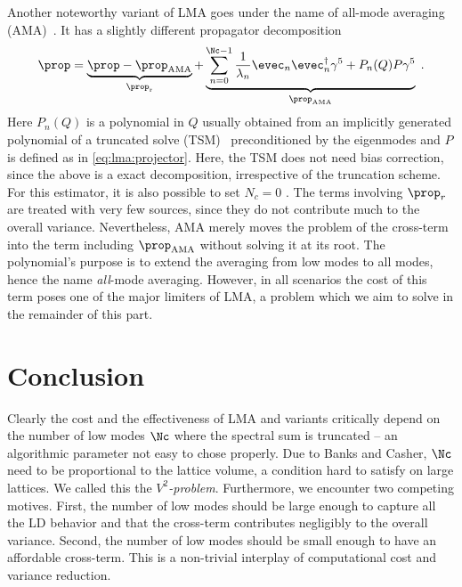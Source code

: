 Another noteworthy variant of LMA goes under the name of all-mode averaging (AMA)~\cite{Blum_2012,Blum_2015,CAA,RBC_2018}.
It has a slightly different propagator decomposition
\begin{equation}
\prop
= \underbrace{\prop - \prop_{\text{AMA}}}_{\prop_{\text{r}}}
+ \underbrace{\sum_{n=0}^{\Nc-1} \frac{1}{\lambda_n} \evec_n \evec_n^{\dagger} \gamma^{5}
+ P_n(Q) P \gamma^{5}}_{\prop_{\text{AMA}}} \;.
\end{equation}
Here $P_n(Q)$ is a polynomial in $Q$ usually obtained from an implicitly generated polynomial of a truncated solve (TSM)~\cite{Bali_2009} preconditioned by the eigenmodes and $P$ is defined as in \cref{eq:lma:projector}.
Here, the TSM does not need bias correction, since the above is a exact decomposition, irrespective of the truncation scheme.
For this estimator, it is also possible to set $N_c=0$ \cite{Blum_2012}.
The terms involving $\prop_{r}$ are treated with very few sources, since they do not contribute much to the overall variance.
Nevertheless, AMA merely moves the problem of the cross-term into the term including $\prop_{\text{AMA}}$ without solving it at its root.
The polynomial's purpose is to extend the averaging from low modes to all modes, hence the name \emph{all}-mode averaging.
However, in all scenarios the cost of this term poses one of the major limiters of LMA, a problem which we aim to solve in the remainder of this part.

\section{Conclusion}
\label{sec:lma:conclusion}

Clearly the cost and the effectiveness of LMA and variants critically depend on the number of low modes $\Nc$ where the spectral sum is truncated -- an algorithmic parameter not easy to chose properly.
Due to Banks and Casher\cite{banks1980}, $\Nc$ need to be proportional to the lattice volume, a condition hard to satisfy on large lattices.
We called this the \emph{$V^{2}$-problem}.
Furthermore, we encounter two competing motives.
First, the number of low modes should be large enough to capture all the LD behavior and that the cross-term contributes negligibly to the overall variance.
Second, the number of low modes should be small enough to have an affordable cross-term.
This is a non-trivial interplay of computational cost and variance reduction.

